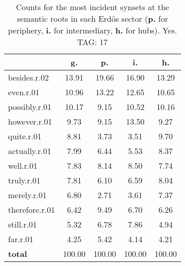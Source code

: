 \begin{table}[h!]
\begin{center}
\begin{tabular}{| l | c | c | c | c |}\hline
 & g. & p. & i. & h. \\\hline
besides.r.02 & 13.91  & 19.66  & 16.90  & 13.29 \\\hline
even.r.01 & 10.96  & 13.22  & 12.65  & 10.65 \\\hline
possibly.r.01 & 10.17  & 9.15  & 10.52  & 10.16 \\\hline
however.r.01 & 9.73  & 9.15  & 13.50  & 9.27 \\\hline
quite.r.01 & 8.81  & 3.73  & 3.51  & 9.70 \\\hline
actually.r.01 & 7.99  & 6.44  & 5.53  & 8.37 \\\hline
well.r.01 & 7.83  & 8.14  & 8.50  & 7.74 \\\hline
truly.r.01 & 7.81  & 6.10  & 6.59  & 8.04 \\\hline
merely.r.01 & 6.80  & 2.71  & 3.61  & 7.37 \\\hline
therefore.r.01 & 6.42  & 9.49  & 6.70  & 6.26 \\\hline
still.r.01 & 5.32  & 6.78  & 7.86  & 4.94 \\\hline
far.r.01 & 4.25  & 5.42  & 4.14  & 4.21 \\\hline
{{\bf total}} & 100.00  & 100.00  & 100.00  & 100.00 \\\hline
\end{tabular}
\caption{Counts for the most incident synsets at the semantic roots in each Erd\"os sector ({\bf p.} for periphery, {\bf i.} for intermediary, {\bf h.} for hubs). Yes. TAG: 17}
\end{center}
\end{table}